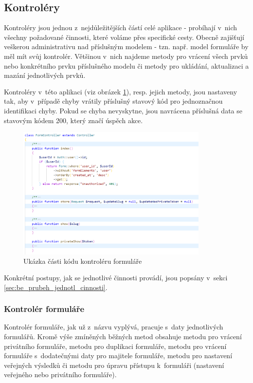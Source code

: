 	\subsection{Kontroléry}
    Kontroléry jsou jednou z~nejdůležitějších částí celé aplikace - probíhají v~nich všechny požadované činnosti, které voláme přes specifické cesty. Obecně zajišťují veškerou administrativu nad příslušným modelem - tzn. např. model formuláře by měl mít svůj kontrolér. Většinou v~nich najdeme metody pro vrácení všech prvků nebo konkrétního prvku příslušného modelu či metody pro ukládání, aktualizaci a mazání jednotlivých prvků.
    
    Kontroléry v~této aplikaci (viz obrázek \ref{fig:kontroler}), resp. jejich metody, jsou nastaveny tak, aby v~případě chyby vrátily příslušný stavový kód pro jednoznačnou identifikaci chyby. Pokud se chyba nevyskytne, jsou navrácena příslušná data se stavovým kódem 200, který značí úspěch akce. 
    
    \begin{figure}[H]
    	\centering
    	\includegraphics[width=0.85\textwidth]{img/kontroler.png}
    	\caption{Ukázka části kódu kontroléru formuláře}
    	\label{fig:kontroler}
    \end{figure}
    
    Konkrétní postupy, jak se jednotlivé činnosti provádí, jsou popsány v~sekci \ref{sec:be_prubeh_jednotl_cinnosti}.
    
		\subsubsection{Kontrolér formuláře}
		Kontrolér formuláře, jak už z~názvu vyplývá, pracuje s~daty jednotlivých formulářů. Kromě výše zmíněných běžných metod obsahuje metodu pro vrácení privátního formuláře, metodu pro duplikaci formuláře, metodu pro vrácení formuláře s~dodatečnými daty pro majitele formuláře, metodu pro nastavení veřejných výsledků či metodu pro úpravu přístupu k~formuláři (nastavení veřejného nebo privátního formuláře).
		
